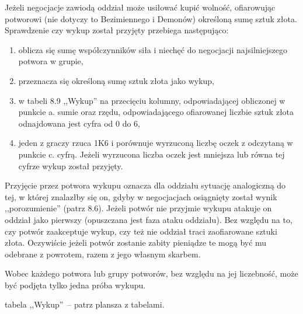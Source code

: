 Jeżeli negocjacje zawiodą oddział może usiłować kupić wolność, ofiarowując potworowi (nie dotyczy to Bezimiennego i Demonów) określoną sumę sztuk złota.
Sprawdzenie czy wykup został przyjęty przebiega następująco:

\begin{enumerate}
    \item
        oblicza się sumę współczynników siła i niechęć do negocjacji najsilniejszego potwora w grupie,
    \item
        przeznacza się określoną sumę sztuk złota jako wykup,
    \item
        w tabeli 8.9 ,,Wykup'' na przecięciu kolumny, odpowiadającej obliczonej w punkcie a. sumie oraz rzędu, odpowiadającego ofiarowanej liczbie sztuk złota odnajdowana jest cyfra od 0 do 6,
    \item
        jeden z graczy rzuca 1K6 i porównuje wyrzuconą liczbę oczek z odczytaną w punkcie c. cyfrą.
        Jeżeli wyrzucona liczba oczek jest mniejsza lub równa tej cyfrze wykup został przyjęty.
\end{enumerate}

Przyjęcie przez potwora wykupu oznacza dla oddziału sytuację analogiczną do tej, w której znalazłby się on, gdyby w negocjacjach osiągnięty został wynik ,,porozumienie'' (patrz 8.6).
Jeżeli potwór nie przyjmie wykupu atakuje on oddział jako pierwszy (opuszczana jest faza ataku oddziału).
Bez względu na to, czy potwór zaakceptuje wykup, czy też nie oddział traci zaofiarowane sztuki złota.
Oczywiście jeżeli potwór zostanie zabity pieniądze te mogą być mu odebrane z powrotem, razem z jego własnym skarbem.

Wobec każdego potwora lub grupy potworów, bez względu na jej liczebność, może być podjęta tylko jedna próba wykupu.

tabela ,,Wykup''~-- patrz plansza z tabelami.
